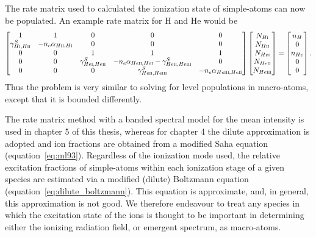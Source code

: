 The rate matrix used to calculated the ionization state of simple-atoms
can now be populated. An example rate matrix for H and He would be
\begin{equation}
\begin{bmatrix}
    1  & 1 & 0 & 0 & 0 \\
    \gamma_{H\textsc{i},H\textsc{ii}}^S & -n_e \alpha_{H\textsc{ii},H\textsc{i}} & 0 & 0 & 0 \\
     0 & 0 & 1 & 1 & 1 \\
     0 & 0 & \gamma_{He\textsc{i},He\textsc{ii}}^S & -n_e \alpha_{He\textsc{ii},He\textsc{i}} - \gamma_{He\textsc{ii},He\textsc{iii}}^S & 0\\
     0 & 0 & 0 & \gamma_{He\textsc{ii},He\textsc{iii}}^S & -n_e \alpha_{He\textsc{iii},He\textsc{ii}}
\end{bmatrix}
\begin{bmatrix}
    N_{H\textsc{i}} \\
    N_{H\textsc{ii}} \\
    N_{He\textsc{i}} \\
    N_{He\textsc{ii}} \\
    N_{He\textsc{iii}} 
\end{bmatrix}
=
\begin{bmatrix}
    n_H \\
    0 \\
    n_{He} \\  
    0 \\
    0
\end{bmatrix}
.
\end{equation}
Thus the problem is very similar to solving for level populations in macro-atoms, except that
it is bounded differently.

The rate matrix method with a banded spectral model for the mean intensity is used
in chapter 5 of this thesis, whereas for chapter 4 the dilute approximation is adopted
and ion fractions are obtained from a modified Saha equation (equation~\ref{eq:ml93}).
Regardless of the ionization mode used, the relative excitation fractions of simple-atoms
within each ionization stage of a given species are 
estimated via a modified (dilute) Boltzmann
equation (equation~\ref{eq:dilute_boltzmann}). This equation is approximate, and, in 
general, this approximation is not good. We therefore endeavour to treat any species in
which the excitation state of the ions is thought to be important
in determining either the ionizing radiation field, or emergent spectrum,
as macro-atoms.

